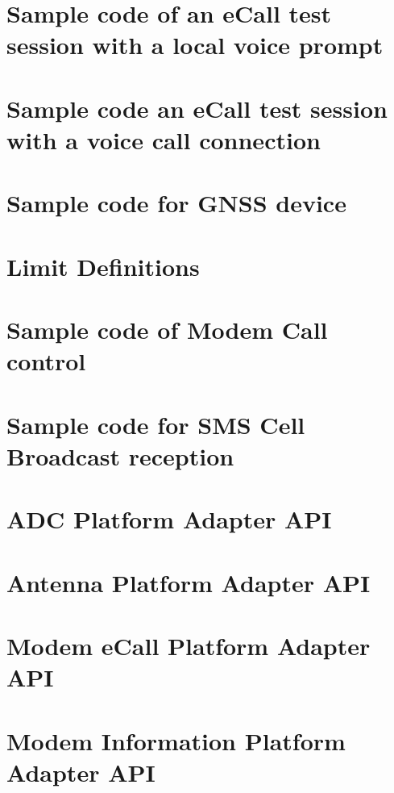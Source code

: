 \documentclass[twoside]{book}
\newcommand{\+}{\discretionary{\mbox{\scriptsize$\hookleftarrow$}}{}{}}
\begin{document}
\chapter{Sample code of an e\+Call test session with a local voice prompt}
\label{c_ecallWPromptSample}
\hypertarget{c_ecallWPromptSample}{}

\chapter{Sample code an e\+Call test session with a voice call connection}
\label{c_ecallWVoiceSample}
\hypertarget{c_ecallWVoiceSample}{}

\chapter{Sample code for G\+N\+SS device}
\label{c_gnssSampleCode}
\hypertarget{c_gnssSampleCode}{}

\chapter{Limit Definitions}
\label{c_limit}
\hypertarget{c_limit}{}

\chapter{Sample code of Modem Call control}
\label{c_mccTest}
\hypertarget{c_mccTest}{}

\chapter{Sample code for S\+MS Cell Broadcast reception}
\label{c_smsCbSample}
\hypertarget{c_smsCbSample}{}

\chapter{A\+DC Platform Adapter A\+PI}
\label{c_pa_adc}
\hypertarget{c_pa_adc}{}

\chapter{Antenna Platform Adapter A\+PI}
\label{c_pa_antenna}
\hypertarget{c_pa_antenna}{}

\chapter{Modem e\+Call Platform Adapter A\+PI}
\label{c_pa_ecall}
\hypertarget{c_pa_ecall}{}

\chapter{Modem Information Platform Adapter A\+PI}
\label{c_pa_info}
\hypertarget{c_pa_info}{}

\end{document}

